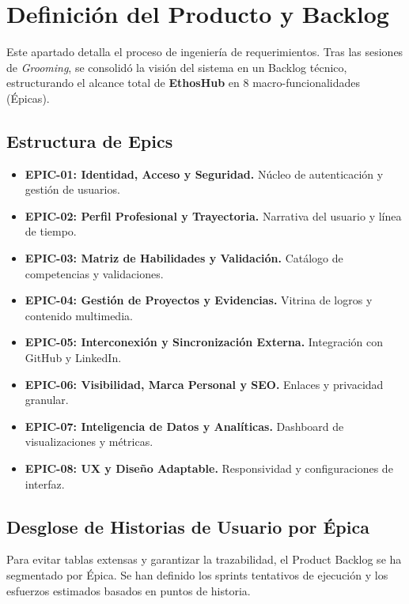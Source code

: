\section{Definición del Producto y Backlog}
\label{sec:definicion_producto}
\raggedbottom

Este apartado detalla el proceso de ingeniería de requerimientos. Tras las sesiones de \textit{Grooming}, se consolidó la visión del sistema en un Backlog técnico, estructurando el alcance total de \textbf{EthosHub} en 8 macro-funcionalidades (Épicas).

\subsection{Estructura de Epics}
\begin{itemize}[noitemsep]
    \item \textbf{EPIC-01: Identidad, Acceso y Seguridad.} Núcleo de autenticación y gestión de usuarios.
    \item \textbf{EPIC-02: Perfil Profesional y Trayectoria.} Narrativa del usuario y línea de tiempo.
    \item \textbf{EPIC-03: Matriz de Habilidades y Validación.} Catálogo de competencias y validaciones.
    \item \textbf{EPIC-04: Gestión de Proyectos y Evidencias.} Vitrina de logros y contenido multimedia.
    \item \textbf{EPIC-05: Interconexión y Sincronización Externa.} Integración con GitHub y LinkedIn.
    \item \textbf{EPIC-06: Visibilidad, Marca Personal y SEO.} Enlaces y privacidad granular.
    \item \textbf{EPIC-07: Inteligencia de Datos y Analíticas.} Dashboard de visualizaciones y métricas.
    \item \textbf{EPIC-08: UX y Diseño Adaptable.} Responsividad y configuraciones de interfaz.
\end{itemize}

\subsection{Desglose de Historias de Usuario por Épica}
Para evitar tablas extensas y garantizar la trazabilidad, el Product Backlog se ha segmentado por Épica. Se han definido los sprints tentativos de ejecución y los esfuerzos estimados basados en puntos de historia.

